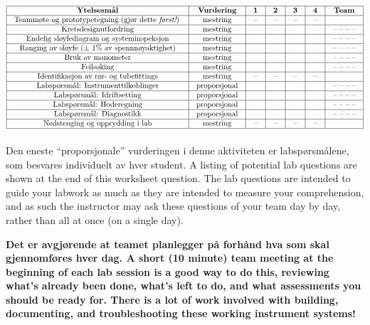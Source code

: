 $$\vbox{\offinterlineskip
\halign{\strut
\vrule \quad\hfil # \ \hfil & 
\vrule \quad\hfil # \ \hfil & 
\vrule \quad\hfil # \ \hfil & 
\vrule \quad\hfil # \ \hfil & 
\vrule \quad\hfil # \ \hfil & 
\vrule \quad\hfil # \ \hfil & 
\vrule \quad\hfil # \ \hfil \vrule \cr
\noalign{\hrule}
%
{\bf Ytelsesmål} & {\bf Vurdering} & {\bf 1} & {\bf 2} & {\bf 3} & {\bf 4} & {\bf Team} \cr
%
\noalign{\hrule}
%
Teammøte og prototypetegning (gjør dette {\it først!}) & mestring & -- & -- & -- & -- & \cr
%
\noalign{\hrule}
%
Kretsdesignutfordring & mestring & & & & & -- -- -- -- \cr
%
\noalign{\hrule}
%
Endelig sløyfediagram og systeminspeksjon & mestring & & & & & -- -- -- -- \cr
%
\noalign{\hrule}
%
Ranging av sløyfe ($\pm$ 1\% av spennnøyaktighet) & mestring & & & & & -- -- -- -- \cr
%
\noalign{\hrule}
%
Bruk av manometer & mestring & & & & & -- -- -- -- \cr
%
\noalign{\hrule}
%
Feilsøking & mestring & & & & & -- -- -- -- \cr
%
\noalign{\hrule}
%
Identifikasjon av rør- og tubefittings & mestring & -- & -- & -- & -- & \cr
%
\noalign{\hrule}
%
Labspørsmål: Instrumenttilkoblinger & proporsjonal &  &  &  &  & -- -- -- -- \cr
%
\noalign{\hrule}
%
Labspørsmål: Idriftsetting & proporsjonal &  &  &  &  & -- -- -- -- \cr
%
\noalign{\hrule}
%
Labspørsmål: Hoderegning & proporsjonal &  &  &  &  & -- -- -- -- \cr
%
\noalign{\hrule}
%
Labspørsmål: Diagnostikk & proporsjonal &  &  &  &  & -- -- -- -- \cr
%
\noalign{\hrule}
%
Nedstenging og opprydding i lab & mestring & -- & -- & -- & -- &  \cr
%
\noalign{\hrule}
} %
}$$ %

Den eneste ``proporsjonale'' vurderingen i denne aktiviteten er labspørsmålene, som besvares individuelt av hver student.  A listing of potential lab questions are shown at the end of this worksheet question.  The lab questions are intended to guide your labwork as much as they are intended to measure your comprehension, and as such the instructor may ask these questions of your team day by day, rather than all at once (on a single day).

\vskip 10pt

{\bf Det er avgjørende at teamet planlegger på forhånd hva som skal gjennomføres hver dag.  A short (10 minute) team meeting at the beginning of each lab session is a good way to do this, reviewing what's already been done, what's left to do, and what assessments you should be ready for.  There is a lot of work involved with building, documenting, and troubleshooting these working instrument systems!}

